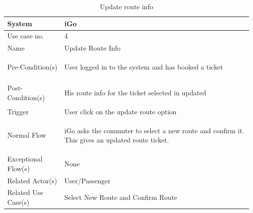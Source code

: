 \documentclass{article}
\begin{document}
\begin{table}[ht]
    \centering
    \begin{tabular}{|l|p{11cm}|}
         \hline
         System& iGo\\
         \hline
         Use case no. & 4 \\
         \hline
         Name & Update Route Info \\
         \hline
         Pre-Condition(s)   & 
         \begin{enumerate*}[itemjoin=\newline]
             \item User logged in to the system and has booked a ticket 
         \end{enumerate*} \\
         \hline
         Post-Condition(s)  & 
         \begin{enumerate*}[itemjoin=\newline]
             \item His route info for the ticket selected in updated
         \end{enumerate*} \\
         \hline
         Trigger& User click on the update route option \\
         \hline
         Normal Flow        & 
         \begin{enumerate*}[itemjoin=\newline]
             \item iGo asks the commuter to select a new route and confirm it. This gives an updated route ticket.    
         \end{enumerate*} \\
         \hline
         Exceptional Flow(s)& None\\
         \hline
         Related Actor(s)   & User/Passenger\\
         \hline
         Related Use Case(s)& Select New Route and Confirm Route\\
         \hline
    \end{tabular}
    \caption{Update route info}
    \label{tab:UC_updateRoute}
\end{table}
\end{document}
